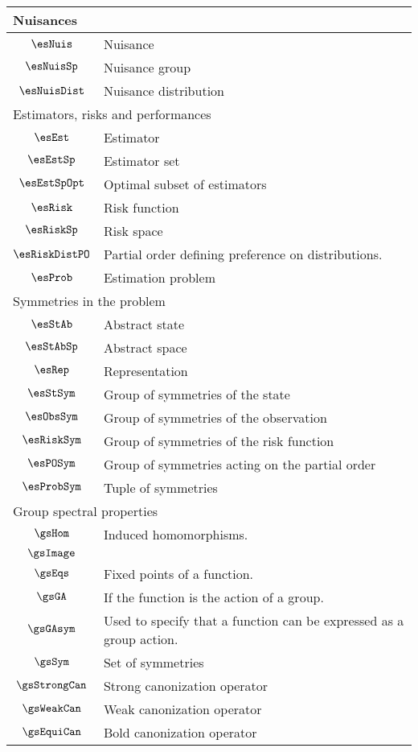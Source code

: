 \begin{longtable}{cl}
 \multicolumn{2}{l}{Nuisances}\\ 
 \hline
$\esNuis$ &  Nuisance\\ 
 $\esNuisSp$ &  Nuisance group\\ 
 $\esNuisDist$ &  Nuisance distribution\\ 
 \multicolumn{2}{l}{Estimators, risks and performances}\\ 
 \hline
$\esEst$ &  Estimator\\ 
 $\esEstSp$ &  Estimator set\\ 
 $\esEstSpOpt$ &  Optimal subset of estimators\\ 
 $\esRisk$ &  Risk function\\ 
 $\esRiskSp$ &  Risk space\\ 
 $\esRiskDistPO$ &  Partial order defining preference on distributions.\\ 
 $\esProb$ &  Estimation problem\\ 
 \multicolumn{2}{l}{Symmetries in the problem}\\ 
 \hline
$\esStAb$ &  Abstract state\\ 
 $\esStAbSp$ &  Abstract space\\ 
 $\esRep$ &  Representation\\ 
 $\esStSym$ &  Group of symmetries of the state\\ 
 $\esObsSym$ &  Group of symmetries of the observation\\ 
 $\esRiskSym$ &  Group of symmetries of the risk function\\ 
 $\esPOSym$ &  Group of symmetries acting on the partial order\\ 
 $\esProbSym$ &  Tuple of symmetries\\ 
 \multicolumn{2}{l}{Group spectral properties}\\ 
 \hline
$\gsHom$ &  Induced homomorphisms.\\ 
 $\gsImage$ &  \\ 
 $\gsEqs$ &  Fixed points of a function.\\ 
 $\gsGA$ &  If the function is the action of a group.\\ 
 $\gsGAsym$ &  Used to specify that a function can be expressed as a group action.\\ 
 $\gsSym$ &  Set of symmetries\\ 
 $\gsStrongCan$ &  Strong canonization operator\\ 
 $\gsWeakCan$ &  Weak canonization operator\\ 
 $\gsEquiCan$ &  Bold canonization operator\\ 

\end{longtable}
